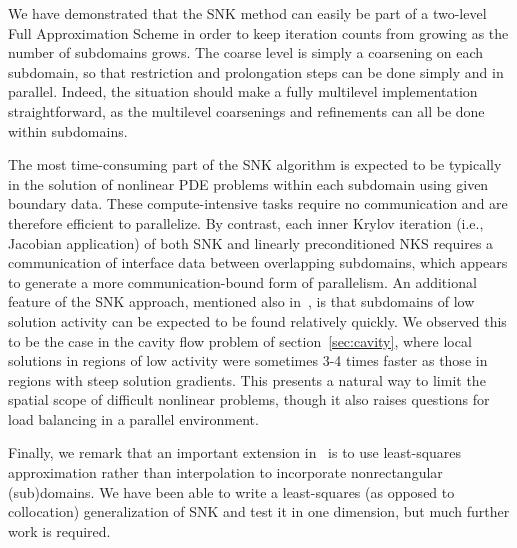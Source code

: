 We have demonstrated that the SNK method can easily be part of a two-level Full Approximation Scheme in order to keep iteration counts from growing as the number of subdomains grows. The coarse level is simply a coarsening on each subdomain, so that restriction and prolongation steps can be done simply and in parallel. Indeed, the situation should make a fully multilevel implementation straightforward, as the multilevel coarsenings and refinements can all be done within subdomains.

The most time-consuming part of the SNK algorithm is expected to be typically in the solution of nonlinear PDE problems within each subdomain using given boundary data. These compute-intensive tasks require no communication and are therefore efficient to parallelize. By contrast, each inner Krylov iteration (i.e., Jacobian application) of both SNK and linearly preconditioned NKS requires a communication of interface data between overlapping subdomains, which appears to generate a more communication-bound form of parallelism. An additional feature of the SNK approach, mentioned also in~\cite{Cai2002}, is that subdomains of low solution activity can be expected to be found relatively quickly. We observed this to be the case in the cavity flow problem of section~\ref{sec:cavity}, where local solutions in regions of low activity were sometimes 3-4 times faster as those in regions with steep solution gradients. This presents a natural way to limit the spatial scope of difficult nonlinear problems, though it also raises questions for load balancing in a parallel environment.

Finally, we remark that an important extension in~\cite{AitonTA} is to use least-squares approximation rather than interpolation to incorporate nonrectangular (sub)domains. We have been able to write a least-squares (as opposed to collocation) generalization of SNK and test it in one dimension, but much further work is required. 